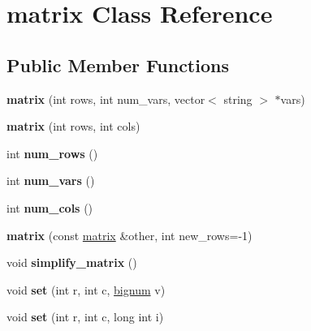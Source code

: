 \hypertarget{classmatrix}{\section{matrix \-Class \-Reference}
\label{classmatrix}
}
\subsection*{\-Public \-Member \-Functions}
\begin{DoxyCompactItemize}
\item 
\hypertarget{classmatrix_a3c6fcf718dcee66b64c02a49fc95d453}{{\bfseries matrix} (int rows, int num\-\_\-vars, vector$<$ string $>$ $\ast$vars)}\label{classmatrix_a3c6fcf718dcee66b64c02a49fc95d453}

\item 
\hypertarget{classmatrix_a9e077c39ae45c2912bba77eb93a296d1}{{\bfseries matrix} (int rows, int cols)}\label{classmatrix_a9e077c39ae45c2912bba77eb93a296d1}

\item 
\hypertarget{classmatrix_a5fd2825c8ca21d023209845f31becc9f}{int {\bfseries num\-\_\-rows} ()}\label{classmatrix_a5fd2825c8ca21d023209845f31becc9f}

\item 
\hypertarget{classmatrix_ac3244bb0c7739890bf309d216e23a055}{int {\bfseries num\-\_\-vars} ()}\label{classmatrix_ac3244bb0c7739890bf309d216e23a055}

\item 
\hypertarget{classmatrix_a04f1d120c6ad17cac1e15ad26e07fb47}{int {\bfseries num\-\_\-cols} ()}\label{classmatrix_a04f1d120c6ad17cac1e15ad26e07fb47}

\item 
\hypertarget{classmatrix_a48c71476541b8b226973016f146484b9}{{\bfseries matrix} (const \hyperlink{classmatrix}{matrix} \&other, int new\-\_\-rows=-\/1)}\label{classmatrix_a48c71476541b8b226973016f146484b9}

\item 
\hypertarget{classmatrix_a01d679e9b5a43a8db13eef2ea7c4653c}{void {\bfseries simplify\-\_\-matrix} ()}\label{classmatrix_a01d679e9b5a43a8db13eef2ea7c4653c}

\item 
\hypertarget{classmatrix_ab72918afc60a2f4ec582de7f89b582ac}{void {\bfseries set} (int r, int c, \hyperlink{classbignum}{bignum} v)}\label{classmatrix_ab72918afc60a2f4ec582de7f89b582ac}

\item 
\hypertarget{classmatrix_a392d201cede47f99cebf3fe683ac1db0}{void {\bfseries set} (int r, int c, long int i)}\label{classmatrix_a392d201cede47f99cebf3fe683ac1db0}


\end{DoxyCompactItemize}
